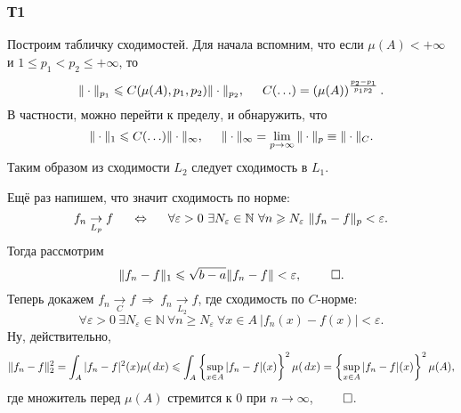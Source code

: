\subsubsection*{Т1}

Построим табличку сходимостей. Для начала вспомним, что если $\mu(A) < + \infty$ и 
$1 \leq p_1 < p_2 \leq + \infty$, то
\begin{equation*}
    \|\cdot\|_{p_1} \leq C(\mu(A), p_1, p_2) \|\cdot\|_{p_2},
    \hspace{5 mm} 
    C(\ldots) = \left(\mu(A)\right)^{\frac{p_2-p_1}{p_1 p_2}}.
\end{equation*}
В частности, можно перейти к пределу, и обнаружить, что
\begin{equation*}
    \|\cdot\|_1 \leq C(\ldots) \|\cdot\|_{\infty},
    \hspace{5 mm} 
    \|\cdot\|_{\infty} = \lim_{p\to \infty} \|\cdot\|_p \equiv \|\cdot\|_C.
\end{equation*}
Таким образом из сходимости $L_2$ следует сходимость в $L_1$. 

Ещё раз напишем, что значит сходимость по норме:
\begin{equation*}
    f_n \underset{L_p}{\to} f
    \hspace{5 mm} \Leftrightarrow \hspace{5 mm} 
    \forall \varepsilon > 0 \ 
    \exists N_\varepsilon \in \mathbb{N} \ 
    \forall n \geq N_\varepsilon \ 
    \|f_n - f\|_p < \varepsilon.
\end{equation*}
Тогда рассмотрим
\begin{equation*}
    \|f_n - f\|_1 \leq \sqrt{b-a}  \|f_n -f\| < \varepsilon,  \ \qed.
\end{equation*}
Теперь докажем $f_n \underset{C}{\to} f \ \Rightarrow \ f_n \underset{L_2}{\to} f$, где сходимость по $C$-норме:
\begin{equation*}
    \forall \varepsilon > 0 \ 
    \exists N_\varepsilon \in \mathbb{N} \ 
    \forall n \geq N_\varepsilon \ 
    \forall x \in A \ 
    |f_n(x)-f(x)| < \varepsilon.
\end{equation*}
Ну, действительно,
\begin{equation*}
    \|f_n -f\|_2^2 = \int_A |f_n-f|^2(x) \mu(\d x) \leq \int_A \left\{
        \sup_{x \in A} |f_n - f|(x)
    \right\}^2 \mu(\d x) = 
    \left\{
        \sup_{x \in A} |f_n - f|(x)
    \right\}^2 \mu(A),
\end{equation*}
где множитель перед $\mu(A)$ стремится к 0 при $n \to \infty$, $\qed$. 


